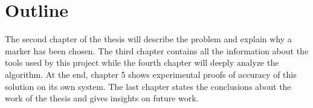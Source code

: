 \section{Outline}
The second chapter of the thesis will describe the problem and explain why a marker has been chosen.
The third chapter contains all the information about the tools used by this project while
the fourth chapter will deeply analyze the algorithm. At the end, chapter 5 shows experimental proofs of accuracy of this solution on its own system.
The last chapter states the conclusions about the work of the thesis and gives insights on future work.






  
